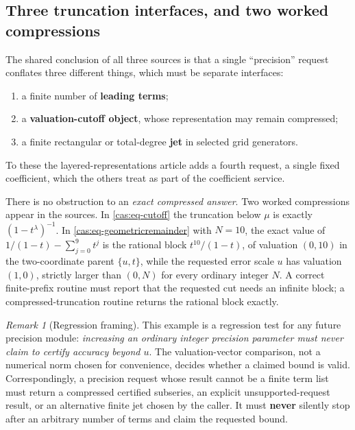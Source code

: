 \documentclass[11pt,letterpaper]{article}
\numberwithin{equation}{section}
\theoremstyle{definition}
\theoremstyle{remark}
\newtheorem{remark}[theorem]{Remark}
\begin{document}
\subsection{Three truncation interfaces, and two worked compressions}
\label{cas:sub-truncation}
The shared conclusion of all three sources is that a single ``precision''
request conflates three different things, which must be separate interfaces:
\begin{enumerate}
\item a finite number of \textbf{leading terms};
\item a \textbf{valuation-cutoff object}, whose representation may remain
compressed;
\item a finite rectangular or total-degree \textbf{jet} in selected grid
generators.
\end{enumerate}
To these the layered-representations article adds a fourth request, a single
fixed coefficient, which the others treat as part of the coefficient service.

There is no obstruction to an \emph{exact compressed answer}. Two worked
compressions appear in the sources. In \eqref{cas:eq-cutoff} the truncation
below $\mu$ is exactly $(1-t^\lambda)^{-1}$. In
\eqref{cas:eq-geometricremainder} with $N=10$, the exact value of
$1/(1-t)-\sum_{j=0}^{9}t^j$ is the rational block $t^{10}/(1-t)$, of valuation
$(0,10)$ in the two-coordinate parent $\{u,t\}$, while the requested error scale
$u$ has valuation $(1,0)$, strictly larger than $(0,N)$ for every ordinary
integer $N$. A correct finite-prefix routine must report that the requested cut
needs an infinite block; a compressed-truncation routine returns the rational
block exactly.

\begin{remark}[Regression framing]\label{cas:rem-regression}
This example is a regression test for any future precision module:
\emph{increasing an ordinary integer precision parameter must never claim to
certify accuracy beyond $u$}. The valuation-vector comparison, not a numerical
norm chosen for convenience, decides whether a claimed bound is valid.
Correspondingly, a precision request whose result cannot be a finite term list
must return a compressed certified subseries, an explicit unsupported-request
result, or an alternative finite jet chosen by the caller. It must
\textbf{never} silently stop after an arbitrary number of terms and claim the
requested bound.
\end{remark}
\end{document}
